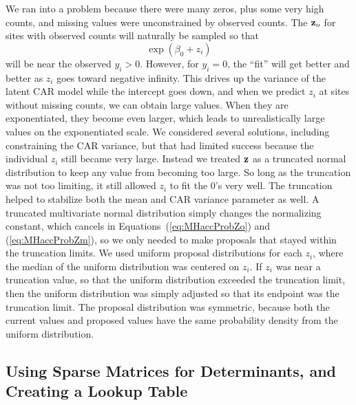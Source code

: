 \documentclass[11pt, titlepage]{article}
\begin{document}
\begin{spacing}{1.9}
\begin{flushleft}
We ran into a problem because there were many zeros, plus some very high counts, and missing values were unconstrained by observed counts.  The $\mathbf{z}_{o}$ for sites with observed counts will naturally be sampled so that 
$$
\exp(\beta_{0} + z_{i})
$$
will be near the observed $y_{i} > 0$. However, for $y_{i} = 0$, the ``fit'' will get better and better as $z_{i}$ goes toward negative infinity. This drives up the variance of the latent CAR model while the intercept goes down, and when we predict $z_{i}$ at sites without missing counts, we can obtain large values.  When they are exponentiated, they become even larger, which leads to unrealistically large values on the exponentiated scale.  We considered several solutions, including constraining the CAR variance, but that had limited success because the individual $z_{i}$ still became very large. Instead we treated $\mathbf{z}$ as a truncated normal distribution to keep any value from becoming too large.  So long as the truncation was not too limiting, it still allowed $z_{i}$ to fit the 0's very well.  The truncation helped to stabilize both the mean and CAR variance parameter as well.  A truncated multivariate normal distribution simply changes the normalizing constant, which  cancels in Equations~(\ref{eq:MHaccProbZo}) and (\ref{eq:MHaccProbZm}), so we only needed to make proposals that stayed within the truncation limits.  We used uniform proposal distributions for each $z_{i}$, where the median of the uniform distribution was centered on $z_{i}$. If $z_{i}$ was near a truncation value, so that the uniform distribution exceeded the truncation limit, then the uniform distribution was simply adjusted so that its endpoint was the truncation limit.  The proposal distribution was symmetric, because both the current values and proposed values have the same probability density from the uniform distribution.


\subsection{Using Sparse Matrices for Determinants, and Creating a Lookup Table}


\end{flushleft}
\end{spacing}
\end{document}
